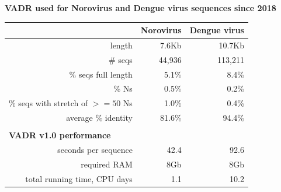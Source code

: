 \documentclass[landscape]{slides}
\begin{document}
\begin{slide}
\begin{center}
\normalsize{\textbf{VADR used for Norovirus and Dengue virus sequences since 2018}}

\scriptsize
\begin{tabular}{r|r|r}
                                                  &Norovirus      &Dengue virus   \\ \hline
length                                            &7.6Kb         &10.7Kb        \\
\# seqs                                           &44,936          &113,211         \\
\% seqs full length                               &5.1\%          &8.4\%          \\
\% Ns                                             &0.5\%          &0.2\%          \\
\% seqs with stretch of $>=50$ Ns                 &1.0\%          &0.4\%          \\
average \% identity                               &81.6\%         &94.4\%         \\ \hline
\multicolumn{3}{l}{} \\ 
\multicolumn{3}{l}{\textbf{VADR v1.0 performance}} \\ \hline
seconds per sequence                   &42.4           &92.6           \\
required RAM                           &8Gb            &8Gb            \\
total running time, CPU days           &1.1            &10.2           \\
\end{tabular}
\end{center}

\vfill
\end{slide}
\end{document}
